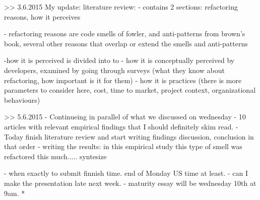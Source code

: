 >> 3.6.2015
My update:
literature review:
- contains 2 sections: refactoring reasons, how it perceives

- refactoring reasons are code smells of fowler, and anti-patterns from brown's book, several other reasons that overlap or extend the smells and anti-patterns

-how it is perceived is divided into to
- how it is conceptually perceived by developers, examined by going through surveys (what they know about refactoring, how important is it for them)
- how it is practices (there is more parameters to consider here, cost, time to market, project context, organizational behaviours)

>> 5.6.2015
- Continueing in parallel of what we discussed on wednesday
- 10 articles with relevant empirical findings that I should definitely skim read. 
- Today finish literature review and start writing findings discussion, conclusion in that order
- writing the results: in this empirical study this type of smell was refactored this much.....
syntesize 

- when exactly to submit finnish time. end of Monday US time at least. 
- can I make the presentation late next week. 
- maturity essay will be wednesday 10th at 9am.
* 
